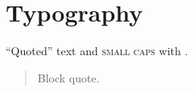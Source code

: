 \documentclass[a4paper]{article}
\begin{document}
\section{Typography}\lipsum[1-8]
\enquote{Quoted} text and \textsc{small caps} with . \blockquote{Block quote.}
\lipsum[9-12]
\end{document}
